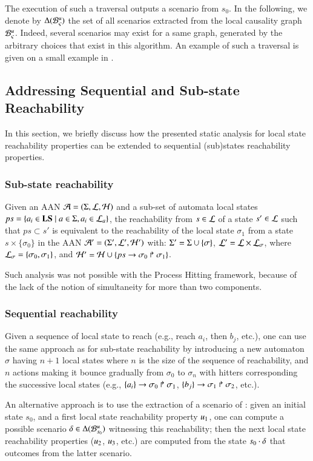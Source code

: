 The execution of such a traversal outputs a scenario from $s_0$.
In the following, we denote by $\Delta({\mathcal{B}_{\varsigma}^{u}})$ the set of all scenarios extracted from the
local causality graph ${\mathcal{B}_{\varsigma}^{u}}$.
Indeed, several scenarios may exist for a same graph,
generated by the arbitrary choices that exist in this algorithm.
An example of such a traversal is given on a small example
in .



\subsection{Addressing Sequential and Sub-state Reachability}
\label{ssec:ordered-ua}
\label{ssec:simult-ua}

\newcommand{\total}{\tau}
\newcommand{\reach}{\sigma}

In this section, we briefly discuss how the presented static analysis for local
state reachability properties can be extended to sequential (sub)states
reachability properties.

\subsubsection*{Sub-state reachability}
Given an AAN $\mathcal{A} = (\Sigma, \mathcal{L}, \mathcal{H})$ and
a sub-set of automata local states
$ps = \{ a_i \in\mathbf{LS}\mid a\in\Sigma, a_i\in\mathcal{L}_a\}$,
the reachability from $s\in\mathcal{L}$ of a state $s'\in\mathcal{L}$ such that
$ps\subset s'$ is equivalent to the reachability of the local state
$\reach_1$ from a state $s \times \{ \reach_0 \}$
in the AAN
$\mathcal{A}' = (\Sigma', \mathcal{L}', \mathcal{H}')$ with:
$\PHs' = \PHs \cup \{ \reach \}$, $\PHl' = \PHl \times \PHl_\reach$,
where $\PHl_\reach = \{ \reach_0, \reach_1 \}$,
and $\PHh' = \PHh \cup \{ \PHhit{ps}{\reach_0}{\reach_1} \}$.

Such analysis was not possible with the Process Hitting framework,
because of the lack of the notion of simultaneity for more than two components.


\subsubsection*{Sequential reachability}
Given a sequence of local state to reach (e.g., reach $a_i$, then $b_j$, etc.),
one can use the same approach as for sub-state reachability by introducing
a new automaton $\reach$ having $n+1$ local states where $n$ is the size of the
sequence of reachability, and $n$ actions making it bounce gradually from $\reach_0$ to
$\reach_n$ with hitters corresponding the successive local states
(e.g., $\PHfrappes{a_i}{\reach_0}{\reach_1}$,
$\PHfrappes{b_j}{\reach_1}{\reach_2}$, etc.).

An alternative approach is to use the extraction of a scenario of
:
given an initial state $s_0$, and a first local state reachability property $u_1$,
one can compute a possible scenario $\delta \in \Delta({\mathcal{B}_{s_0}^{u}})$
witnessing this reachability;
then the next local state reachability properties ($u_2$, $u_3$, etc.)
are computed from the
state $s_0 \cdot \delta$ that outcomes from the latter scenario.
